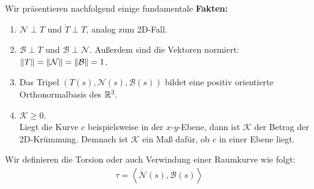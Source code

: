 Wir präsentieren nachfolgend einige fundamentale \textbf{Fakten:}
\begin{enumerate}
	\item $\mathcal{N} \perp T$ und $\dot{T} \perp T$, analog zum 2D-Fall.
	\item $\mathcal{B} \perp T$ und $\mathcal{B}\perp\mathcal{N}$. Außerdem sind die Vektoren normiert: $\norm{T} = \norm{\mathcal{N}} = \norm{\mathcal{B}} = 1$. 
	\item Das Tripel $\left(T(s),\mathcal{N}(s),\mathcal{B}(s)\right)$ bildet eine positiv orientierte Orthonormalbasis des $\mathbb{R}^3$.
	\item $\mathcal{K} \geq 0$.\\
		 Liegt die Kurve $c$ beispielsweise in der $x$-$y$-Ebene, dann ist $\mathcal{K}$ der Betrag der 2D-Krümmung. Demnach ist $\mathcal{K}$ ein Maß dafür, ob $c$ in einer Ebene liegt.
\end{enumerate}
\begin{defs}
	Wir definieren die Torsion oder auch Verwindung einer Raumkurve wie folgt: 
	\begin{align}
		\tau = \left<\dot{\mathcal{N}}(s),\mathcal{B}(s)\right> 
	\end{align}
\end{defs}

